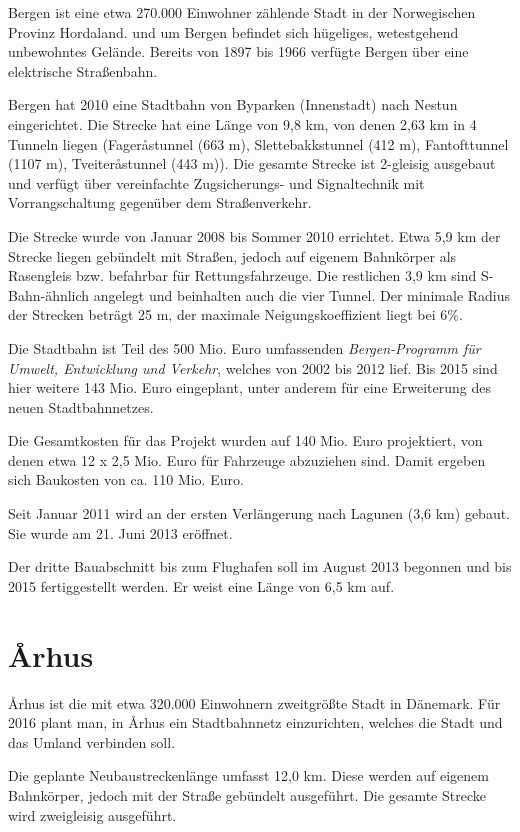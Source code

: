 Bergen ist eine etwa 270.000 Einwohner zählende Stadt in der Norwegischen
Provinz Hordaland.  und um Bergen befindet sich hügeliges, wetestgehend
unbewohntes Gelände. Bereits von 1897 bis 1966 verfügte Bergen über eine
elektrische Straßenbahn.

Bergen hat 2010 eine Stadtbahn von Byparken (Innenstadt) nach Nestun
eingerichtet. Die Strecke hat eine Länge von 9,8 km, von denen 2,63 km in 4
Tunneln liegen (Fageråstunnel (663 m), Slettebakkstunnel (412 m), Fantofttunnel
(1107 m), Tveiteråstunnel (443 m)). Die gesamte Strecke ist 2-gleisig ausgebaut
und verfügt über vereinfachte Zugsicherungs- und Signaltechnik mit
Vorrangschaltung gegenüber dem Straßenverkehr.

Die Strecke wurde von Januar 2008 bis Sommer 2010 errichtet. Etwa 5,9 km der
Strecke liegen gebündelt mit Straßen, jedoch auf eigenem Bahnkörper als
Rasengleis bzw. befahrbar für Rettungsfahrzeuge. Die restlichen 3,9 km sind
S-Bahn-ähnlich angelegt und beinhalten auch die vier Tunnel. Der minimale Radius
der Strecken beträgt 25 m, der maximale Neigungskoeffizient liegt bei 6\%.

Die Stadtbahn ist Teil des 500 Mio. Euro umfassenden \emph{Bergen-Programm für
Umwelt, Entwicklung und Verkehr}, welches von 2002 bis 2012 lief. Bis 2015 sind
hier weitere 143 Mio. Euro eingeplant, unter anderem für eine Erweiterung des
neuen Stadtbahnnetzes.

Die Gesamtkosten für das Projekt wurden auf 140 Mio. Euro projektiert, von denen
etwa 12 x 2,5 Mio. Euro für Fahrzeuge abzuziehen sind. Damit ergeben sich
Baukosten von ca. 110 Mio. Euro.

Seit Januar 2011 wird an der ersten Verlängerung nach Lagunen (3,6 km)
gebaut. Sie wurde am 21. Juni 2013 eröffnet.

Der dritte Bauabschnitt bis zum Flughafen soll im August 2013 begonnen und bis
2015 fertiggestellt werden. Er weist eine Länge von 6,5 km auf.

\section{Århus}

Århus ist die mit etwa 320.000 Einwohnern zweitgrößte Stadt in Dänemark. Für 2016
plant man, in Århus ein Stadtbahnnetz einzurichten, welches die Stadt und das
Umland verbinden soll.

Die geplante Neubaustreckenlänge umfasst 12,0 km. Diese werden auf eigenem
Bahnkörper, jedoch mit der Straße gebündelt ausgeführt. Die gesamte Strecke wird
zweigleisig ausgeführt.


